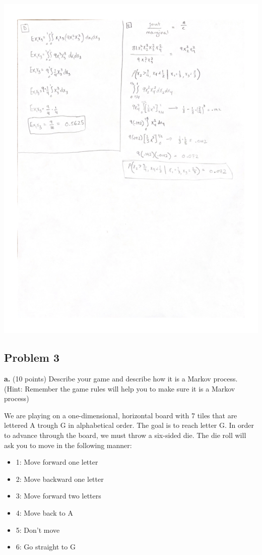 \documentclass[
]{article}
\providecommand{\tightlist}{%
  \setlength{\itemsep}{0pt}\setlength{\parskip}{0pt}}
\begin{document}
\includegraphics{./Q2sideB.png}

\hypertarget{problem-3}{%
\subsection{Problem 3}\label{problem-3}}

\textbf{a.} (10 points) Describe your game and describe how it is a
Markov process. (Hint: Remember the game rules will help you to make
sure it is a Markov process)

We are playing on a one-dimensional, horizontal board with 7 tiles that
are lettered A trough G in alphabetical order. The goal is to reach
letter G. In order to advance through the board, we must throw a
six-sided die. The die roll will ask you to move in the following
manner:

\begin{itemize}
\tightlist
\item
  1: Move forward one letter
\item
  2: Move backward one letter
\item
  3: Move forward two letters
\item
  4: Move back to A
\item
  5: Don't move
\item
  6: Go straight to G
\end{itemize}
\end{document}
